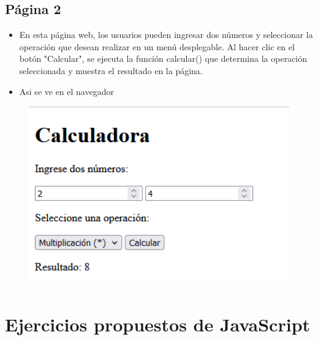 \documentclass{article}
\begin{document}
	\subsection{Página 2}
 		
		\begin{itemize}
			\item En esta página web, los usuarios pueden ingresar dos números y seleccionar la operación que desean realizar en un menú desplegable. Al hacer clic en el botón "Calcular", se ejecuta la función calcular() que determina la operación seleccionada y muestra el resultado en la página.
			\item Asi se ve en el navegador
		\end{itemize}  
		\begin{figure}[H]
			\centering
			\includegraphics[width=1.0\textwidth,keepaspectratio]{img/pagina2.PNG}
		\end{figure}
\section{Ejercicios propuestos de JavaScript}
\end{document}
